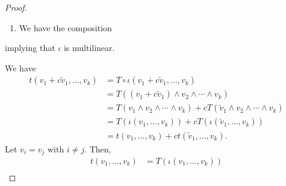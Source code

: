 \documentclass[10pt]{mypackage}
\begin{document}
  \begin{proof}\hfill
    \begin{enumerate}[(1)]
      \item We have the composition
        \begin{center}
        \end{center}
    \end{enumerate}
    implying that $\iota$ is multilinear.
  \item We have
    \begin{align*}
      t\left(v_1 + c\tilde{v}_1,\dots,v_k\right) &= T\circ \iota \left(v_1 + c\tilde{v}_1,\dots,v_k\right)\\
                                                     &= T\left(\left(v_1 + c\tilde{v}_1\right)\wedge v_2\wedge\cdots\wedge v_k\right)\\
                                                     &= T\left(v_1\wedge v_2\wedge\cdots\wedge v_k\right) + cT\left(\tilde{v}_1\wedge v_2\wedge\cdots\wedge v_k\right)\\
                                                     &= T\left(\iota\left(v_1,\dots,v_k\right)\right) + cT\left(\iota\left(\tilde{v}_1,\dots,v_k\right)\right)\\
                                                     &= t\left(v_1,\dots,v_k\right) + ct\left(\tilde{v}_1,\dots,v_k\right).
    \end{align*}
    Let $v_i = v_j$ with $i\neq j$. Then,
    \begin{align*}
      t\left(v_1,\dots,v_k\right) &= T\left(\iota\left(v_1,\dots,v_k\right)\right)\\

\end{align*}
\end{proof}
\end{document}
